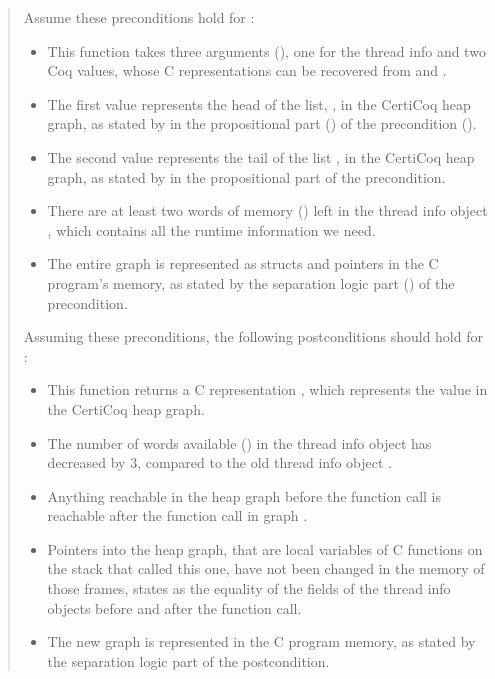 \begin{quote}
Assume these preconditions hold for \allocmakecons{}:
\begin{itemize}
\item This function takes three arguments (), one for the \gls{thread info} and two Coq values, whose C representations can be recovered from  and .
\item The first value  represents the head of the list, , in the \gls{CertiCoq heap} graph,  as stated by  in the propositional part () of the precondition ().
\item The second value  represents the tail of the list , in the \gls{CertiCoq heap} graph, as stated by  in the propositional part of the precondition.
\item There are at least two words of memory () left in the \gls{thread info} object , which contains all the runtime information we need.
\item The entire graph  is represented as structs and pointers in the C program's memory, as stated by the separation logic part () of the precondition.
\end{itemize}
Assuming these preconditions, the following postconditions should hold for \allocmakecons{}: 
\begin{itemize}
\item This function returns a C representation , which represents the value  in the \gls{CertiCoq heap} graph. 
\item The number of words available () in the \gls{thread info} object  has decreased by 3, compared to the old \gls{thread info} object .
\item Anything reachable in the heap graph  before the function call is reachable after the function call in graph .
\item Pointers into the heap graph, that are local variables of C functions on the stack that called this one, have not been changed in the memory of those frames, states as the equality of the  fields of the \gls{thread info} objects before and after the function call.
\item The new graph  is represented in the C program memory, as stated by the separation logic part of the postcondition.
\end{itemize}
\end{quote}



